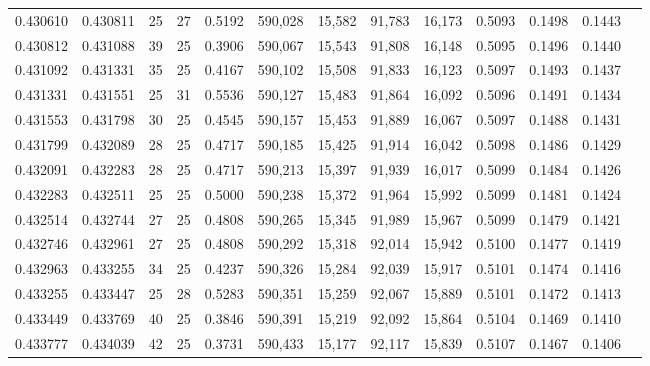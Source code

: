 \begin{tabular}{rrrrrrrrrrrrr}
0.430610 & 0.430811 &    25 &  27 &                                     0.5192 & 590,028 &  15,582 &  91,783 &  16,173 & 0.5093 & 0.1498 & 0.1443 \\
0.430812 & 0.431088 &    39 &  25 &                                     0.3906 & 590,067 &  15,543 &  91,808 &  16,148 & 0.5095 & 0.1496 & 0.1440 \\
0.431092 & 0.431331 &    35 &  25 &                                     0.4167 & 590,102 &  15,508 &  91,833 &  16,123 & 0.5097 & 0.1493 & 0.1437 \\
0.431331 & 0.431551 &    25 &  31 &                                     0.5536 & 590,127 &  15,483 &  91,864 &  16,092 & 0.5096 & 0.1491 & 0.1434 \\
0.431553 & 0.431798 &    30 &  25 &                                     0.4545 & 590,157 &  15,453 &  91,889 &  16,067 & 0.5097 & 0.1488 & 0.1431 \\
0.431799 & 0.432089 &    28 &  25 &                                     0.4717 & 590,185 &  15,425 &  91,914 &  16,042 & 0.5098 & 0.1486 & 0.1429 \\
0.432091 & 0.432283 &    28 &  25 &                                     0.4717 & 590,213 &  15,397 &  91,939 &  16,017 & 0.5099 & 0.1484 & 0.1426 \\
0.432283 & 0.432511 &    25 &  25 &                                     0.5000 & 590,238 &  15,372 &  91,964 &  15,992 & 0.5099 & 0.1481 & 0.1424 \\
0.432514 & 0.432744 &    27 &  25 &                                     0.4808 & 590,265 &  15,345 &  91,989 &  15,967 & 0.5099 & 0.1479 & 0.1421 \\
0.432746 & 0.432961 &    27 &  25 &                                     0.4808 & 590,292 &  15,318 &  92,014 &  15,942 & 0.5100 & 0.1477 & 0.1419 \\
0.432963 & 0.433255 &    34 &  25 &                                     0.4237 & 590,326 &  15,284 &  92,039 &  15,917 & 0.5101 & 0.1474 & 0.1416 \\
0.433255 & 0.433447 &    25 &  28 &                                     0.5283 & 590,351 &  15,259 &  92,067 &  15,889 & 0.5101 & 0.1472 & 0.1413 \\
0.433449 & 0.433769 &    40 &  25 &                                     0.3846 & 590,391 &  15,219 &  92,092 &  15,864 & 0.5104 & 0.1469 & 0.1410 \\
0.433777 & 0.434039 &    42 &  25 &                                     0.3731 & 590,433 &  15,177 &  92,117 &  15,839 & 0.5107 & 0.1467 & 0.1406 \\

\end{tabular}
